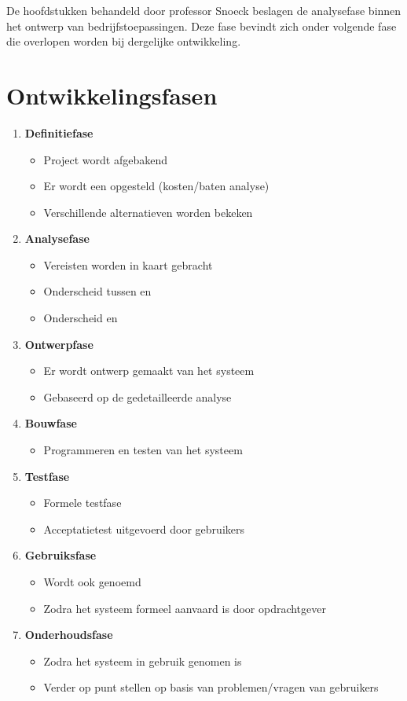 \documentclass[../main.tex]{subfiles}
\begin{document}
De hoofdstukken behandeld door professor Snoeck beslagen de analysefase binnen het ontwerp van bedrijfstoepassingen. Deze fase bevindt zich onder volgende fase die overlopen worden bij dergelijke ontwikkeling.

\section{Ontwikkelingsfasen}
\begin{enumerate}
	\item \textbf{Definitiefase}
	\begin{itemize}
			\item Project wordt afgebakend
			\item Er wordt een  opgesteld (kosten/baten analyse)
			\item Verschillende alternatieven worden bekeken
	\end{itemize}
	\item \textbf{Analysefase}
	\begin{itemize}
		\item Vereisten worden in kaart gebracht
		\item Onderscheid tussen  en 
		\item Onderscheid  en 
	\end{itemize}
	\item \textbf{Ontwerpfase}
	\begin{itemize}
		\item Er wordt ontwerp gemaakt van het systeem
		\item Gebaseerd op de gedetailleerde analyse
	\end{itemize}
	\item \textbf{Bouwfase}
	\begin{itemize}
		\item Programmeren en testen van het systeem
	\end{itemize}
	\item \textbf{Testfase}
	\begin{itemize}
		\item Formele testfase
		\item Acceptatietest uitgevoerd door gebruikers
	\end{itemize}
	\item \textbf{Gebruiksfase}
	\begin{itemize}
		\item Wordt ook  genoemd
		\item Zodra het systeem formeel aanvaard is door opdrachtgever
	\end{itemize}
	\item \textbf{Onderhoudsfase}
	\begin{itemize}
		\item Zodra het systeem in gebruik genomen is
		\item Verder op punt stellen op basis van problemen/vragen van gebruikers
	\end{itemize}

\end{enumerate}
\end{document}
